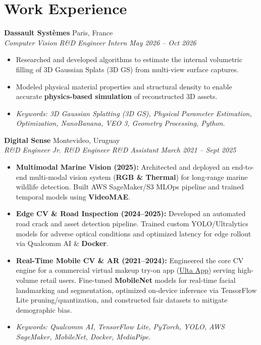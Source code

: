 \documentclass[10pt, a4paper]{article}
\newcommand{\entryheader}[4]{
    \noindent \textbf{#1} \hfill #2 \\
    \textit{#3} \hfill \textit{#4} \vspace{0pt}
}
\begin{document}
\section{Work Experience}

\entryheader{Dassault Systèmes}{Paris, France}{Computer Vision R\&D Engineer Intern}{May 2026 -- Oct 2026}
\begin{itemize}
    \item Researched and developed algorithms to estimate the internal volumetric filling of 3D Gaussian Splats (3D GS) from multi-view surface captures.
    \item Modeled physical material properties and structural density to enable accurate \textbf{physics-based simulation} of reconstructed 3D assets.
    \item \textit{Keywords: 3D Gaussian Splatting (3D GS), Physical Parameter Estimation, Optimization, NanoBanana, VEO 3, Geometry Processing, Python.}
\end{itemize}
\vspace{3pt}

\entryheader{Digital Sense}{Montevideo, Uruguay}{R\&D Engineer \textbar{} Jr. R\&D Engineer \textbar{} R\&D Assistant}{March 2021 -- Sept 2025}
\begin{itemize}
    \item \textbf{Multimodal Marine Vision (2025):} Architected and deployed an end-to-end multi-modal vision system (\textbf{RGB \& Thermal}) for long-range marine wildlife detection. Built AWS SageMaker/S3 MLOps pipeline and trained temporal models using \textbf{VideoMAE}.
    \item \textbf{Edge CV \& Road Inspection (2024--2025):} Developed an automated road crack and asset detection pipeline. Trained custom YOLO/Ultralytics models for adverse optical conditions and optimized latency for edge rollout via Qualcomm AI \& \textbf{Docker}.
    \item \textbf{Real-Time Mobile CV \& AR (2021--2024):} Engineered the core CV engine for a commercial virtual makeup try-on app (\href{https://www.ulta.com/company/app?srsltid=AfmBOorrV_A9GKMtuqNiCTeg1_JPuXVPm-JVckez5tHgEYyQP1o90QxV}{Ulta App}) serving high-volume retail users. Fine-tuned \textbf{MobileNet} models for real-time facial landmarking and segmentation, optimized on-device inference via TensorFlow Lite pruning/quantization, and constructed fair datasets to mitigate demographic bias.
    \item \textit{Keywords: Qualcomm AI, TensorFlow Lite, PyTorch, YOLO, AWS SageMaker, MobileNet, Docker, MediaPipe.}
\end{itemize}
\end{document}
